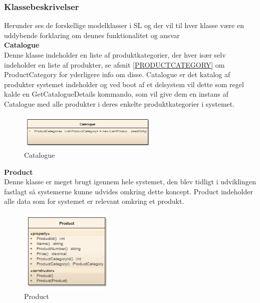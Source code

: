 \subsubsection{Klassebeskrivelser}
Herunder ses de forskellige modelklasser i \gls{SL} og der vil til hver klasse være en uddybende forklaring om dennes funktionalitet og ansvar\\

\textbf{Catalogue}\\
Denne klasse indeholder en liste af produktkategorier, der hver især selv indeholder en liste af produkter, se afsnit \ref{PRODUCTCATEGORY} om ProductCategory for yderligere info om disse. Catalogue er det katalog af produkter systemet indeholder og ved boot af et delsystem vil dette som regel kalde en GetCatalogueDetails kommando, som vil give dem en instans af Catalogue med alle produkter i deres enkelte produktkategorier i systemet.

\begin{figure}[H]
    \centering
    \includegraphics[width=0.6\textwidth]{Systemdesign/SharedLib/Images/Klasser/Model/Catalogue.png}
    \caption{Catalogue}
    \label{fig:klasseModelCata}
\end{figure}

\textbf{Product}\\
Denne klasse er meget brugt igennem hele systemet, den blev tidligt i udviklingen fastlagt så systemerne kunne udvides omkring dette koncept. Product indeholder alle data som for systemet er relevant omkring et produkt.

\begin{figure}[H]
    \centering
    \includegraphics[width=0.4\textwidth]{Systemdesign/SharedLib/Images/Klasser/Model/Product.png}
    \caption{Product}
    \label{fig:klasseModelPrd}
\end{figure}


